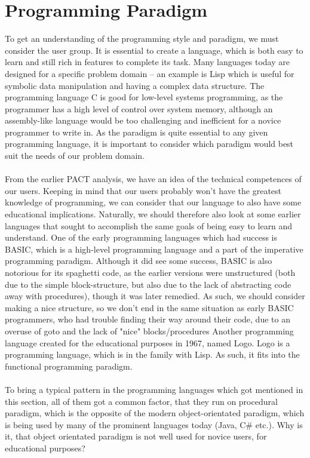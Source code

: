 
\section{Programming Paradigm}
\label{programmingparadigm}
To get an understanding of the programming style and paradigm, we must consider the user group. It is essential to create a language, which is both easy to learn and still rich in features to complete its task. Many languages today are designed for a specific problem domain – an example is Lisp which is useful for symbolic data manipulation and having a complex data structure. The programming language C is good for low-level systems programming, as the programmer has a high level of control over system memory, although an assembly-like language would be too challenging and inefficient for a novice programmer to write in.
As the paradigm is quite essential to any given programming language, it is important to consider which paradigm would best suit the needs of our problem domain.\\
\\
From the earlier PACT analysis, we have an idea of the technical competences of our users. Keeping in mind that our users probably won't have the greatest knowledge of programming, we can consider that our language to also have some educational implications. Naturally, we should therefore also look at some earlier languages that sought to accomplish the same goals of being easy to learn and understand.
One of the early programming languages which had success is BASIC, which is a high-level programming language and a part of the imperative programming paradigm. Although it did see some success, BASIC is also notorious for its spaghetti code, as the earlier versions were unstructured (both due to the simple block-structure, but also due to the lack of abstracting code away with procedures), though it was later remedied. As such, we should consider making a nice structure, so we don't end in the same situation as early BASIC programmers, who had trouble finding their way around their code, due to an overuse of goto and the lack of "nice" blocks/procedures
Another programming language created for the educational purposes in 1967, named Logo. Logo is a programming language, which is in the family with Lisp. As such, it fits into the functional programming paradigm. \cite{scott2000programming} \\
\\
To bring a typical pattern in the programming languages which got mentioned in this section, all of them got a common factor, that they run on procedural paradigm, which is the opposite of the modern object-orientated paradigm, which is being used by many of the prominent languages today (Java, C\# etc.). Why is it, that object orientated paradigm is not well used for novice users, for educational purposes? \\
